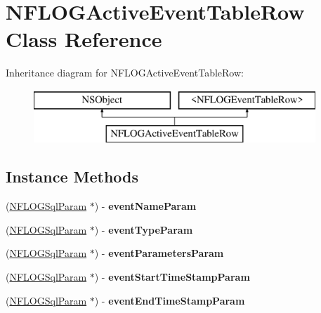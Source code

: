 \hypertarget{interface_n_f_l_o_g_active_event_table_row}{}\section{N\+F\+L\+O\+G\+Active\+Event\+Table\+Row Class Reference}
\label{interface_n_f_l_o_g_active_event_table_row}
Inheritance diagram for N\+F\+L\+O\+G\+Active\+Event\+Table\+Row\+:\begin{figure}[H]
\begin{center}
\leavevmode
\includegraphics[height=2.000000cm]{interface_n_f_l_o_g_active_event_table_row}
\end{center}
\end{figure}
\subsection*{Instance Methods}
\begin{DoxyCompactItemize}
\item 
\mbox{\label{interface_n_f_l_o_g_active_event_table_row_a88fb7f4f02de4dac3c7534cd497659e9}} 
(\hyperlink{interface_n_f_l_o_g_sql_param}{N\+F\+L\+O\+G\+Sql\+Param} $\ast$) -\/ {\bfseries event\+Name\+Param}
\item 
\mbox{\label{interface_n_f_l_o_g_active_event_table_row_a5ba3af12af8e320443bd3aa57732197e}} 
(\hyperlink{interface_n_f_l_o_g_sql_param}{N\+F\+L\+O\+G\+Sql\+Param} $\ast$) -\/ {\bfseries event\+Type\+Param}
\item 
\mbox{\label{interface_n_f_l_o_g_active_event_table_row_a0c613b3e6d28303791a2ef6fa103f00d}} 
(\hyperlink{interface_n_f_l_o_g_sql_param}{N\+F\+L\+O\+G\+Sql\+Param} $\ast$) -\/ {\bfseries event\+Parameters\+Param}
\item 
\mbox{\label{interface_n_f_l_o_g_active_event_table_row_a74614c6139f7b9e0f12d16e9f67d79cc}} 
(\hyperlink{interface_n_f_l_o_g_sql_param}{N\+F\+L\+O\+G\+Sql\+Param} $\ast$) -\/ {\bfseries event\+Start\+Time\+Stamp\+Param}
\item 
\mbox{\label{interface_n_f_l_o_g_active_event_table_row_ac755f0cf6a88faf499a297692b4bcd66}} 
(\hyperlink{interface_n_f_l_o_g_sql_param}{N\+F\+L\+O\+G\+Sql\+Param} $\ast$) -\/ {\bfseries event\+End\+Time\+Stamp\+Param}
\end{DoxyCompactItemize}

